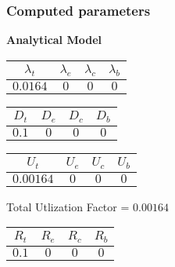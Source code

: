\documentclass{article}
\begin{document}
\subsubsection{Computed parameters}
\begin{minipage}{0.5\textwidth}
\centering	\textbf{Analytical Model}
\begin{table}[H]
\centering
\begin{tabular}{@{}cccc@{}}
\toprule
$\lambda_t$ & $\lambda_e$ & $\lambda_c$ & $\lambda_b$\\
\midrule
$0.0164$ & $0$ & $0$ & $0$\\
\bottomrule
\end{tabular}
\end{table}\begin{table}[H]
\centering
\begin{tabular}{@{}cccc@{}}
\toprule
$D_t$ & $D_e$ & $D_c$ & $D_b$\\
\midrule
$0.1$ & $0$ & $0$ & $0$\\
\bottomrule
\end{tabular}
\end{table}\begin{table}[H]
\centering
\begin{tabular}{@{}cccc@{}}
\toprule
$U_t$ & $U_e$ & $U_c$ & $U_b$\\
\midrule
$0.00164$ & $0$ & $0$ & $0$\\
\bottomrule
\end{tabular}
\end{table}
\centering Total Utlization Factor = $0.00164$
\begin{table}[H]
\centering
\begin{tabular}{@{}cccc@{}}
\toprule
$R_t$ & $R_e$ & $R_c$ & $R_b$\\
\midrule
$0.1$ & $0$ & $0$ & $0$\\
\bottomrule
\end{tabular}
\end{table}
\end{minipage}
\end{document}
